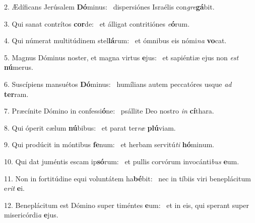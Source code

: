 2. Ædíficans Jerúsalem \textbf{Dó}minus: \ast\  dispersiónes Israélis con\textit{gre}\textbf{gá}bit.\

3. Qui sanat contrítos \textbf{cor}de: \ast\  et álligat contritiónes \textit{e}\textbf{ó}rum.\

4. Qui númerat multitúdinem stel\textbf{lá}rum: \ast\  et ómnibus eis nómi\textit{na} \textbf{vo}cat.\

5. Magnus Dóminus noster, et magna virtus \textbf{e}jus: \ast\  et sapiéntiæ ejus non \textit{est} \textbf{nú}merus.\

6. Suscípiens mansuétos \textbf{Dó}minus: \ast\  humílians autem peccatóres usque \textit{ad} \textbf{ter}ram.\

7. Præcínite Dómino in confessi\textbf{ó}ne: \ast\  psállite Deo nostro \textit{in} \textbf{cí}thara.\

8. Qui óperit cælum \textbf{nú}bibus: \ast\  et parat ter\textit{ræ} \textbf{plú}viam.\

9. Qui prodúcit in móntibus \textbf{fe}num: \ast\  et herbam servitú\textit{ti} \textbf{hó}minum.\

10. Qui dat juméntis escam ip\textbf{só}rum: \ast\  et pullis corvórum invocánti\textit{bus} \textbf{e}um.\

11. Non in fortitúdine equi voluntátem ha\textbf{bé}bit: \ast\  nec in tíbiis viri beneplácitum e\textit{rit} \textbf{e}i.\

12. Beneplácitum est Dómino super timéntes \textbf{e}um: \ast\  et in eis, qui sperant super misericórdi\textit{a} \textbf{e}jus.\

